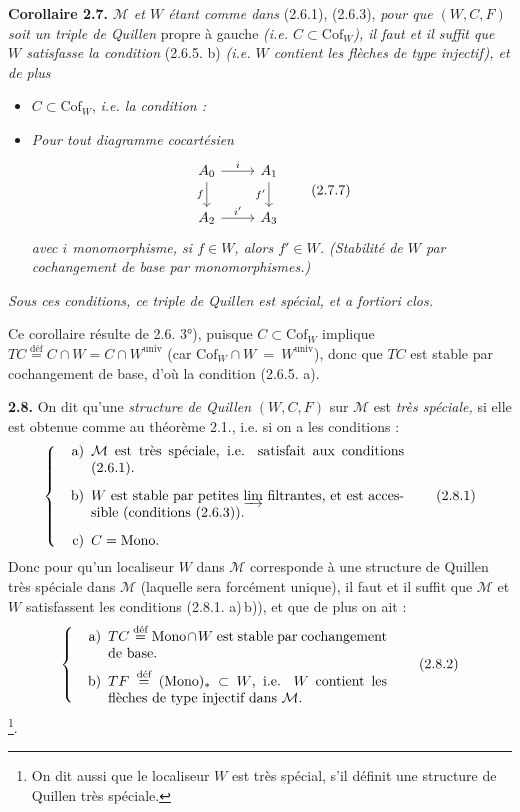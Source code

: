 \documentclass[11pt]{article}
\newcommand{\printedpage}[1]{\marginpar{\footnotesize p.~#1}}
\newcommand{\msp}[1]{\marginpar{\footnotesize [#1]}}
\newcommand{\deq}{\overset{\text{déf}}{=}}
\newcommand{\Mono}{\mathrm{Mono}}
\newcommand{\Cof}{\mathrm{Cof}}
\begin{document}
\textbf{Corollaire 2.7.} \textit{$\mathcal{M}$ et $W$ étant comme dans} (2.6.1), (2.6.3), \textit{pour que $(W,C,F)$ soit un triple de Quillen} propre à gauche \textit{(i.e. $C \subset \Cof_W$), il faut et il suffit que $W$ satisfasse la condition} (2.6.5. b) \textit{(i.e. $W$ contient les flèches de type injectif), et de plus}
\msp{page 27}

\begin{itemize}[leftmargin=7em]
\item[] $C \subset \Cof_W$, \textit{i.e. la condition :}
\item[a$'$)] \textit{Pour tout diagramme cocartésien}
\[ \begin{tikzcd}
A_0 \arrow[r, "i"] \arrow[d, "f"'] & A_1 \arrow[d, "f'"'] \\
A_2 \arrow[r, "i'"] & A_3
\end{tikzcd} \tag*{(2.7.7)} \]
\textit{avec $i$ monomorphisme, si $f \in W$, alors $f' \in W$. (Stabilité de $W$ par cochangement de base par monomorphismes.)}
\end{itemize}

\textit{Sous ces conditions, ce triple de Quillen est spécial, et a fortiori clos.}

Ce corollaire résulte de 2.6. 3°), puisque $C \subset \Cof_W$ implique $TC \deq C\cap W = C\cap W^{\mathrm{univ}}$ (car $\Cof_W \cap W \ = \ W^{\mathrm{univ}}$), donc que $TC$ est stable par cochangement de base, d'où la condition (2.6.5. a).

\printedpage{17}

\textbf{2.8.} On dit qu'une \textit{structure de Quillen} $(W,C,F)$ sur $\mathcal{M}$ est \textit{très spéciale,} si elle est obtenue comme au théorème 2.1., i.e. si on a les conditions :
\[ \left\{ \begin{minipage}{0.72\textwidth}
\begin{itemize}[leftmargin=2.5em]
\item[a)] $\mathcal{M}$ est très spéciale, i.e. satisfait aux conditions (2.6.1).
\item[b)] $W$ est stable par petites $\varinjlim$ filtrantes, et est accessible (conditions (2.6.3)).
\item[c)] $C = \Mono$.
\end{itemize}
\end{minipage}\right. \tag*{(2.8.1)} \]
Donc pour qu'un localiseur $W$ dans $\mathcal{M}$ corresponde à une structure de Quillen très spéciale \msp{page 28} dans $\mathcal{M}$ (laquelle sera forcément unique), il faut et il suffit que $\mathcal{M}$ et $W$ satisfassent les conditions (2.8.1. a)\,b)), et que de plus on ait :
\[ \left\{ \begin{minipage}{0.65\textwidth}
\begin{itemize}[leftmargin=2.5em]
\item[a)] $TC \deq \Mono\cap W$ est stable par cochangement de base.
\item[b)] $TF \deq (\Mono)_* \subset W$, i.e. $W$ contient les flèches de type injectif dans $\mathcal{M}$.
\end{itemize}
\end{minipage}\right. \tag*{(2.8.2)} \]
\footnote[16]{On dit aussi que le localiseur $W$ est très spécial, s'il définit une structure de Quillen très spéciale.}.
\end{document}
